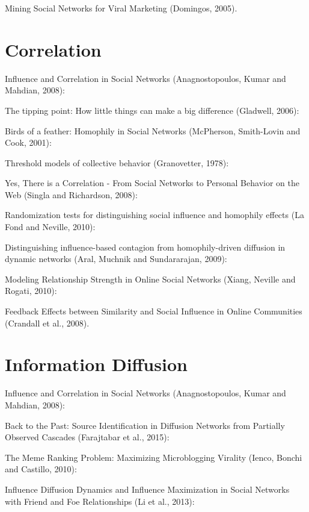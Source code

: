 Mining Social Networks for Viral Marketing (Domingos, 2005).


\section*{Correlation}

Influence and Correlation in Social Networks (Anagnostopoulos, Kumar and Mahdian, 2008):

The tipping point: How little things can make a big difference (Gladwell, 2006):

Birds of a feather: Homophily in Social Networks (McPherson, Smith-Lovin and Cook, 2001):

Threshold models of collective behavior (Granovetter, 1978):

Yes, There is a Correlation - From Social Networks to Personal Behavior on the Web (Singla and Richardson, 2008):

Randomization tests for distinguishing social influence and homophily effects (La Fond and Neville, 2010):

Distinguishing influence-based contagion from homophily-driven diffusion in dynamic networks (Aral, Muchnik and Sundararajan, 2009):

Modeling Relationship Strength in Online Social Networks (Xiang, Neville and Rogati, 2010):

Feedback Effects between Similarity and Social Influence in Online Communities (Crandall et al., 2008).


\section*{Information Diffusion}

Influence and Correlation in Social Networks (Anagnostopoulos, Kumar and Mahdian, 2008):

Back to the Past: Source Identification in Diffusion Networks from Partially Observed Cascades (Farajtabar et al., 2015):

The Meme Ranking Problem: Maximizing Microblogging Virality (Ienco, Bonchi and Castillo, 2010):

Influence Diffusion Dynamics and Influence Maximization in Social Networks with Friend and Foe Relationships (Li et al., 2013):

